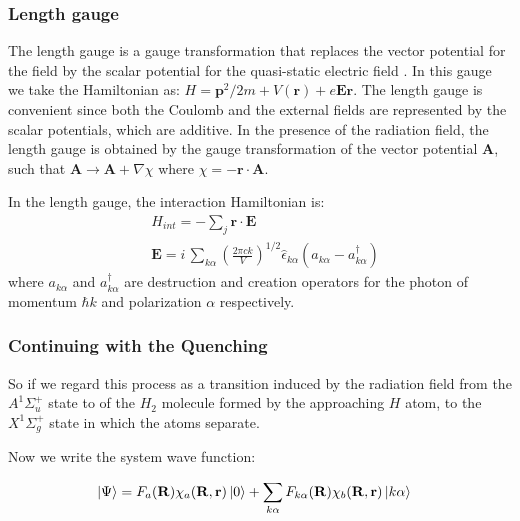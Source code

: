 \subsubsection {Length gauge}

The length gauge is a gauge transformation that replaces the vector potential for the field by the scalar potential for the quasi-static electric field \cite{LengthGauge3}.  In this gauge we take the Hamiltonian as: $ H = \mathbf{p}^2/2m + V(\mathbf{r})  + e\mathbf{E}\mathbf{r} $. The length gauge is convenient since both the Coulomb and the external fields are represented by the scalar potentials, which are additive. In the presence of the radiation field, the length gauge is obtained by the gauge transformation of the vector potential $ \mathbf{A} $, such that $ \mathbf{A} \rightarrow \mathbf{A} + \nabla \chi $ where $ \chi = - \mathbf{r} \cdot \mathbf{A} $. 

In the length gauge, the interaction Hamiltonian is:
\begin{equation}
\begin{split}
& H_{int} = -\sum_j{ \mathbf{r}\cdot\mathbf{E} } \\[.8em]
& \mathbf{E} = i\,\sum_{k\alpha}{\left(\frac{2\pi c k}{V}\right)^{1/2}\hat{\epsilon}_{k\alpha}\left(a_{k\alpha} - a^{\dagger}_{k\alpha}\right)}
\end{split}
\end{equation}
where $ a_{k\alpha} $ and $ a^{\dagger}_{k\alpha} $ are destruction and creation operators for the photon of momentum $ \hbar k $ and polarization $ \alpha $ respectively.

\subsubsection{ Continuing with the Quenching }

So if we regard this process as a transition induced by the radiation field from the $ A^{1}\Sigma^{+}_u $ state to of the $ H_2 $ molecule formed by the approaching $ H $ atom, to the $ X^{1}\Sigma^{+}_g $ state in which the atoms separate.

Now we write the system wave function:

\begin{equation}\label{ansatz}
\begin{split}
& \Ket{\Psi} = F_a(\mathbf{R})\chi_a(\mathbf{R},\mathbf{r})\Ket{0} + \sum_{k\alpha}{F_{k\alpha}(\mathbf{R})\chi_b(\mathbf{R},\mathbf{r})\Ket{k\alpha}}
\end{split}
\end{equation}

